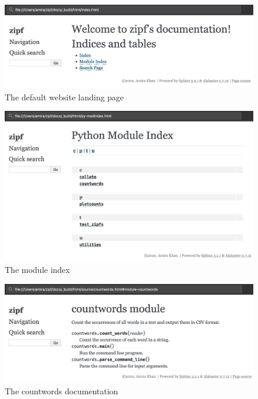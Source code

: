 \documentclass[
]{krantz}
\begin{document}
\begin{figure}

{\centering \includegraphics[width=1\linewidth]{figures/packaging/landing-page-original} 

}

\caption{The default website landing page}\label{fig:packaging-sphinx-landing-page-original}
\end{figure}

\begin{figure}

{\centering \includegraphics[width=1\linewidth]{figures/packaging/module-index} 

}

\caption{The module index}\label{fig:packaging-sphinx-module-list}
\end{figure}

\begin{figure}

{\centering \includegraphics[width=1\linewidth]{figures/packaging/module-countwords} 

}

\caption{The countwords documentation}\label{fig:packaging-sphinx-module-countwords}
\end{figure}
\end{document}
